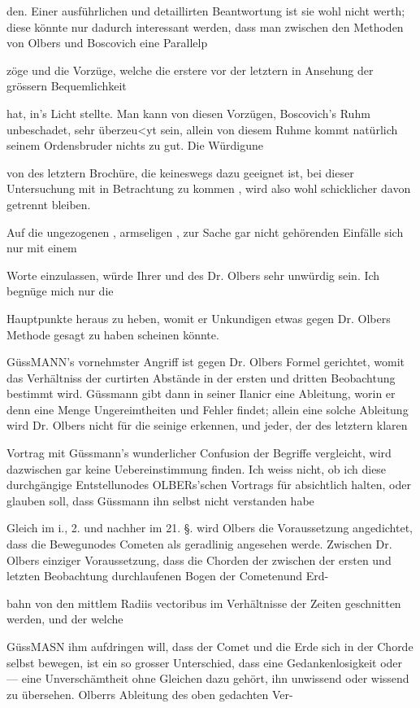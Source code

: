 \documentclass[10pt,a4paper]{article}
\begin{document}
den. Einer ausführlichen und detaillirten Beantwortung ist sie wohl nicht werth; diese könnte nur dadurch interessant werden, dass man zwischen den Methoden von Olbers und Boscovich eine Parallelp

zöge und die Vorzüge, welche die erstere vor der letztern in Ansehung der grössern Bequemlichkeit

hat, in's Licht stellte. Man kann von diesen Vorzügen, Boscovich's Ruhm unbeschadet, sehr überzeu<yt sein, allein von diesem Ruhme kommt natürlich seinem Ordensbruder nichts zu gut. Die Würdigune

von des letztern Brochüre, die keineswegs dazu geeignet ist, bei dieser Untersuchung mit in Betrachtung zu kommen , wird also wohl schicklicher davon getrennt bleiben.

Auf die ungezogenen , armseligen , zur Sache gar nicht gehörenden Einfälle sich nur mit einem

Worte einzulassen, würde Ihrer und des Dr. Olbers sehr unwürdig sein. Ich begnüge mich nur die

Hauptpunkte heraus zu heben, womit er Unkundigen etwas gegen Dr. Olbers Methode gesagt zu haben scheinen könnte.

GüssMANN's vornehmster Angriff ist gegen Dr. Olbers Formel gerichtet, womit das Verhältniss der curtirten Abstände in der ersten und dritten Beobachtung bestimmt wird. Güssmann gibt dann in seiner Ilanicr eine Ableitung, worin er denn eine Menge Ungereimtheiten und Fehler findet; allein eine solche Ableitung wird Dr. Olbers nicht für die seinige erkennen, und jeder, der des letztern klaren

Vortrag mit Güssmann's wunderlicher Confusion der Begriffe vergleicht, wird dazwischen gar keine Uebereinstimmung finden. Ich weiss nicht, ob ich diese durchgängige Entstellunodes OLBERs'schen Vortrags für absichtlich halten, oder glauben soll, dass Güssmann ihn selbst nicht verstanden habe

Gleich im i., 2. und nachher im 21. §. wird Olbers die Voraussetzung angedichtet, dass die Bewegunodes Cometen als geradlinig angesehen werde. Zwischen Dr. Olbers einziger Voraussetzung, dass die Chorden der zwischen der ersten und letzten Beobachtung durchlaufenen Bogen der Cometenund Erd-

bahn von den mittlem Radiis vectoribus im Verhältnisse der Zeiten geschnitten werden, und der welche

GüssMASN ihm aufdringen will, dass der Comet und die Erde sich in der Chorde selbst bewegen, ist ein so grosser Unterschied, dass eine Gedankenlosigkeit oder — eine Unverschämtheit ohne Gleichen dazu gehört, ihn unwissend oder wissend zu übersehen. Olberrs Ableitung des oben gedachten Ver-
\end{document}
